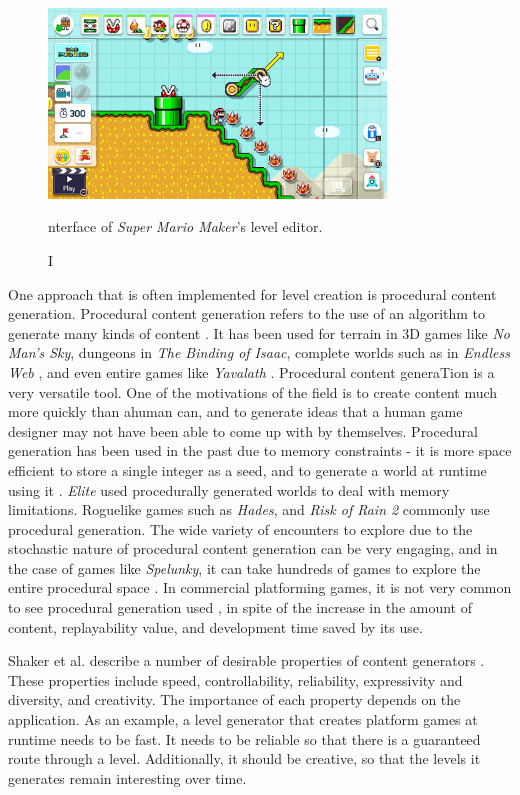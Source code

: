 \begin{figure}[h]
    \centering
    \includegraphics[width=0.8\textwidth]{img/fig1-mm-editor.jpg}
    \caption Interface of \emph{Super Mario Maker}'s level editor.
    \label{fig:mm-editor}
\end{figure}

One approach that is often implemented for level creation is procedural content generation.
Procedural content generation refers to the use of an algorithm to generate many kinds of
content \cite{shaker2016}. It has been used for terrain in 3D games like 
\emph{No Man's Sky}, dungeons in \emph{The Binding of Isaac}, complete worlds such as in
\emph{Endless Web} \cite{smith2013}, and even entire games like \emph{Yavalath}
\cite{browne2011}. Procedural content generaTion is a very versatile tool. One of the
motivations of the field is to create content much more quickly than ahuman can, and to
generate ideas that a human game designer may not have been able to come up with by
themselves. Procedural generation has been used in the past due to memory constraints - it
is more space efficient to store a single integer as a seed, and to generate a world at
runtime using it \cite{shaker2012}. \emph{Elite} used procedurally generated worlds to deal
with memory limitations. Roguelike games such as \emph{Hades}, and \emph{Risk of Rain 2}
commonly use procedural generation. The wide variety of encounters to explore due to the
stochastic nature of procedural content generation can be very engaging, and in the case of
games like \emph{Spelunky}, it can take hundreds of games to explore the entire procedural
space \cite{kazemi2009b}. In commercial platforming games, it is not very common to see
procedural generation used \cite{compton2006}, in spite of the increase in the amount of
content, replayability value, and development time saved by its use.

Shaker et al. describe a number of desirable properties of content generators \cite[6-7]{shaker2016}.
These properties include speed, controllability, reliability, expressivity and diversity,
and creativity. The importance of each property depends on the application. As an example,
a level generator that creates platform games at runtime needs to be fast. It needs to be
reliable so that there is a guaranteed route through a level. Additionally, it should be
creative, so that the levels it generates remain interesting over time.

